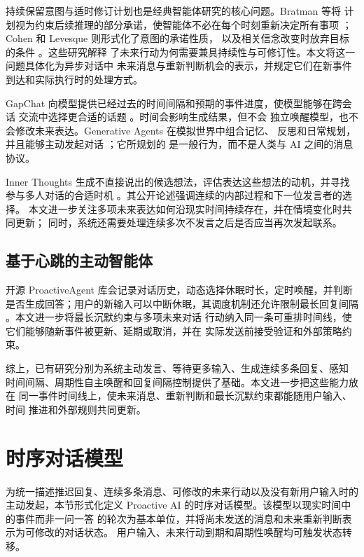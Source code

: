 \documentclass[manuscript,nonacm]{acmart}
\begin{document}
持续保留意图与适时修订计划也是经典智能体研究的核心问题。Bratman 等将
计划视为约束后续推理的部分承诺，使智能体不必在每个时刻重新决定所有事项
\cite{bratman1988plans}；Cohen 和 Levesque 则形式化了意图的承诺性质，
以及相关信念改变时放弃目标的条件 \cite{cohen1990intention}。这些研究解释
了未来行动为何需要兼具持续性与可修订性。本文将这一问题具体化为异步对话中
未来消息与重新判断机会的表示，并规定它们在新事件到达和实际执行时的处理方式。

GapChat 向模型提供已经过去的时间间隔和预期的事件进度，使模型能够在跨会话
交流中选择更合适的话题 \cite{zhang2023gap}。时间会影响生成结果，但不会
独立唤醒模型，也不会修改未来表达。Generative Agents 在模拟世界中组合记忆、
反思和日常规划，并且能够主动发起对话 \cite{park2023generative}；它所规划的
是一般行为，而不是人类与 AI 之间的消息协议。

Inner Thoughts 生成不直接说出的候选想法，评估表达这些想法的动机，并寻找
参与多人对话的合适时机
\cite{liu2025inner}。其公开论述强调连续的内部过程和下一位发言者的选择。
本文进一步关注多项未来表达如何沿现实时间持续存在，并在情境变化时共同更新；
同时，系统还需要处理连续多次不发言之后是否应当再次发起联系。

\subsection{基于心跳的主动智能体}

开源 ProactiveAgent 库会记录对话历史，动态选择休眠时长，定时唤醒，并判断
是否生成回答；用户的新输入可以中断休眠，其调度机制还允许限制最长回复间隔
\cite{mariga2024proactiveagent}。本文进一步将最长沉默约束与多项未来对话
行动纳入同一条可重排时间线，使它们能够随新事件被更新、延期或取消，并在
实际发送前接受验证和外部策略约束。

综上，已有研究分别为系统主动发言、等待更多输入、生成连续多条回复、感知
时间间隔、周期性自主唤醒和回复间隔控制提供了基础。本文进一步把这些能力放在
同一事件时间线上，使未来消息、重新判断和最长沉默约束都能随用户输入、时间
推进和外部规则共同更新。

\section{时序对话模型}

为统一描述推迟回复、连续多条消息、可修改的未来行动以及没有新用户输入时的
主动发起，本节形式化定义 Proactive AI 的时序对话模型。该模型以现实时间中的事件而非一问一答
的轮次为基本单位，并将尚未发送的消息和未来重新判断表示为可修改的对话状态。
用户输入、未来行动到期和周期性唤醒均可触发状态转移。
\end{document}
